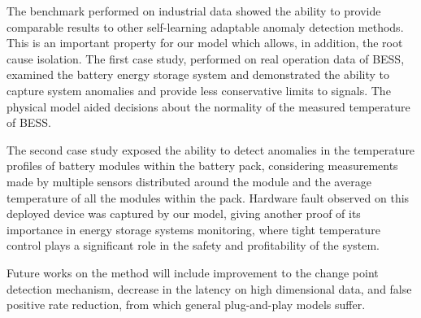 The benchmark performed on industrial data showed the ability to provide comparable results to other self-learning adaptable anomaly detection methods. This is an important property for our model which allows, in addition, the root cause isolation.
The first case study, performed on real operation data of BESS, examined the battery energy storage system and demonstrated the ability to capture system anomalies and provide less conservative limits to signals. The physical model aided decisions about the normality of the measured temperature of BESS.

The second case study exposed the ability to detect anomalies in the temperature profiles of battery modules within the battery pack, considering measurements made by multiple sensors distributed around the module and the average temperature of all the modules within the pack. Hardware fault observed on this deployed device was captured by our model, giving another proof of its importance in energy storage systems monitoring, where tight temperature control plays a significant role in the safety and profitability of the system.

Future works on the method will include improvement to the change point detection mechanism, decrease in the latency on high dimensional data, and false positive rate reduction, from which general plug-and-play models suffer.
